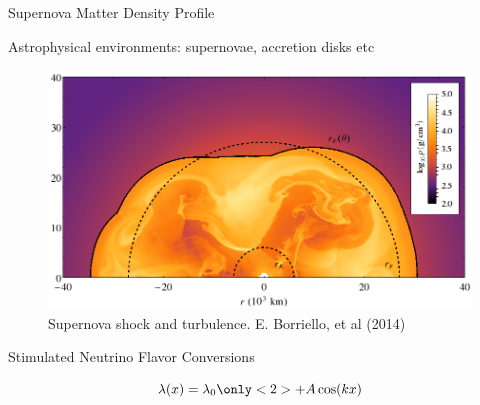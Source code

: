 \documentclass[9pt]{beamer}
\begin{document}
\begin{darkframes}
\begin{frame}{Supernova Matter Density Profile}

\begin{tcolorbox}%

Astrophysical environments: supernovae, accretion disks etc

\end{tcolorbox}

\begin{figure}
    \centering
    \includegraphics[height=0.5\textheight]{assets/supernova-shock-turbulence.png}
    \caption*{Supernova shock and turbulence. E. Borriello, et al  (2014)}
\end{figure}



\end{frame}










\begin{frame}{Stimulated Neutrino Flavor Conversions}







\begin{equation*}
    \lambda(x) = \lambda_0\only<2>{ + A \cos(k x )}
\end{equation*}




\end{frame}
\end{darkframes}
\end{document}
